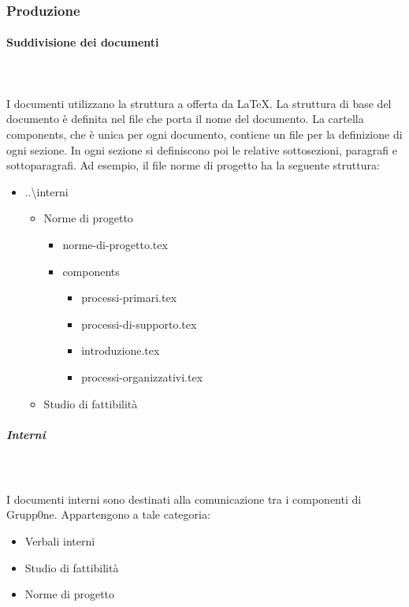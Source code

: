 \documentclass[../norme-di-progetto.tex]{subfiles}
\begin{document}
\subsubsection{Produzione}
\paragraph{Suddivisione dei documenti}\mbox{}\\
\\I documenti utilizzano la struttura a  offerta da \LaTeX. La struttura di base del documento è definita nel file che porta il nome del documento. La cartella components, che è unica per ogni documento, contiene un file per la definizione di ogni sezione. In ogni sezione si definiscono poi le relative sottosezioni, paragrafi e sottoparagrafi.
Ad esempio, il file norme di progetto ha la seguente struttura:

\begin{itemize}
  \item ..\textbackslash interni
  \begin{itemize}
  \item Norme di progetto
     \begin{itemize}
       \item norme-di-progetto.tex
       \item components
       \begin{itemize}
         \item processi-primari.tex
         \item processi-di-supporto.tex
         \item introduzione.tex
         \item processi-organizzativi.tex
       \end{itemize}
     \end{itemize}
  \item Studio di fattibilità
  \end{itemize}
\end{itemize}

\subparagraph{Interni}\mbox{}\\
\label{subp:interni}
\\ I documenti interni sono destinati alla comunicazione tra i componenti di Grupp0ne. Appartengono a tale categoria:

\begin{itemize}
  \item Verbali interni
  \item Studio di fattibilità
  \item Norme di progetto
\end{itemize}
\end{document}
